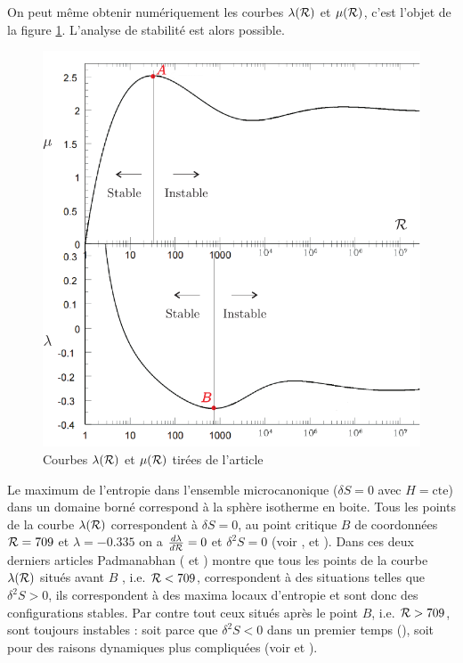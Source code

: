 	On peut même obtenir numériquement les courbes $\lambda(\mathcal{R})$ et $\mu(\mathcal{R})$, c'est l'objet de la figure \ref{Cal_stab}. L'analyse de stabilité est alors possible. 
	\begin{figure}[h!]
		\centering \includegraphics[scale=1.00]{graphe/calorique_stabilite.pdf}
		\caption{Courbes $\lambda(\mathcal{R})$ et $\mu(\mathcal{R})$ tirées de l'article \cite{2011MNRAS.414.2728Y}}
		\label{Cal_stab}
	\end{figure}
	Le maximum de l'entropie dans l'ensemble microcanonique ($\delta S=0$ avec $H=\mathrm{cte}$) dans un domaine borné correspond à la sphère isotherme en boite. Tous les points de la courbe $\lambda(\mathcal{R})$ correspondent à $\delta S=0$, au point critique $B$ de coordonnées $\mathcal{R}=709$ et $\lambda=-0.335$ on a $\frac{d\lambda}{d\mathcal{R}}=0$ et $\delta^2 S=0$ (voir \cite{1968MNRAS.138..495L}, \cite{1989ApJS...71..651P} et \cite{1990PhR...188..285P}). Dans ces deux derniers articles Padmanabhan (\cite{1989ApJS...71..651P} et \cite{1990PhR...188..285P}) montre que tous les points de la courbe $\lambda(\mathcal{R})$ situés avant $B$ , i.e. $\mathcal{R} < 709$, correspondent à des situations telles que $\delta^2 S>0$, ils correspondent à des maxima locaux d'entropie et sont donc des configurations stables. Par contre tout ceux situés après le point $B$, i.e. $\mathcal{R} > 709$, sont toujours instables : soit parce que $\delta^2 S<0$ dans un premier temps (\cite{1989ApJS...71..651P}), soit pour des raisons dynamiques plus compliquées (voir \cite{Katz-Stab} et \cite{1979MNRAS.189..817K}). 
	
